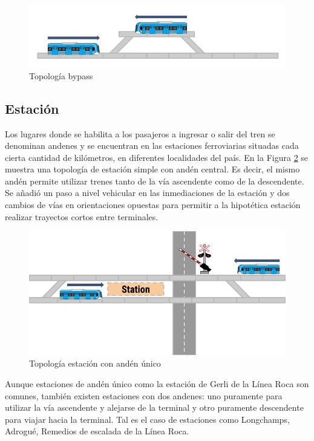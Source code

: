 		\begin{figure}[h]
		\centering
			\includegraphics[scale=.5]{./Figures/Bypass_2}
			\caption{Topología bypass}
			\label{fig:Bypass}
		\end{figure}

	\vspace{5cm}
				
	\subsection{Estación}

		Los lugares donde se habilita a los pasajeros a ingresar o salir del tren se denominan andenes y se encuentran en las estaciones ferroviarias situadas cada cierta cantidad de kilómetros, en diferentes localidades del país. En la Figura \ref{fig:Estacion} se muestra una topología de estación simple con andén central. Es decir, el mismo andén permite utilizar trenes tanto de la vía ascendente como de la descendente. Se añadió un paso a nivel vehicular en las inmediaciones de la estación y dos cambios de vías en orientaciones opuestas para permitir a la hipotética estación realizar trayectos cortos entre terminales.
		
			\begin{figure}[h]
			\centering
				\includegraphics[scale=.5]{./Figures/Estacion}
				\caption{Topología estación con andén único}
				\label{fig:Estacion}
			\end{figure}
		
		Aunque estaciones de andén único como la estación de Gerli de la Línea Roca son comunes, también existen estaciones con dos andenes: uno puramente para utilizar la vía ascendente y alejarse de la terminal y otro puramente descendente para viajar hacia la terminal. Tal es el caso de estaciones como Longchamps, Adrogué, Remedios de escalada de la Línea Roca.


